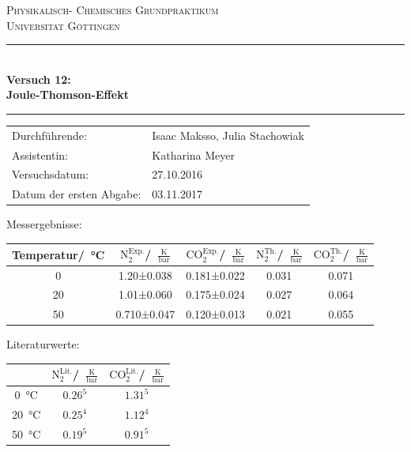 \documentclass[a4paper,12pt,oneside,onecolum,final,openany]{report}
\begin{document}
\begin{titlepage}
\centering
\textsc{\Large Physikalisch- Chemisches Grundpraktikum\\[1.5ex] Universität Göttingen}

\vspace*{0.5cm}

\rule{\textwidth}{1pt}\\[0.5cm]
{\huge \bfseries
  Versuch 12: \\[1.5ex]
  Joule-Thomson-Effekt}\\[0.5cm]
\rule{\textwidth}{1pt}

\vspace*{0.5cm}


\begin{Large}
\begin{tabular}{ll}
Durchführende: &  Isaac Maksso, Julia Stachowiak\\
Assistentin: & Katharina Meyer \\
 Versuchsdatum: & 27.10.2016\\
 Datum der ersten Abgabe: & 03.11.2017\\
\end{tabular}
\end{Large}

\vspace*{0.5cm}

 Messergebnisse:\\
\begin{table}[h]
\centering 
 \begin{tabular}{c|c|c|c|c}
 Temperatur/~°C&$\text{N}_2^{\text{Exp.}}$/~$\frac{\text{K}}{\text{bar}}$&$\text{CO}_2^{\text{Exp.}}$/~$\frac{\text{K}}{\text{bar}}$&$\text{N}_2^{\text{Th.}}$/~$\frac{\text{K}}{\text{bar}}$&$\text{CO}_2^{\text{Th.}}$/~$\frac{\text{K}}{\text{bar}}$\\
 \hline
 0 &1.20±0.038&0.181±0.022&0.031&0.071\\
 \hline
 20 &1.01±0.060&0.175±0.024&0.027&0.064\\
\hline 
50 &0.710±0.047&0.120±0.013&0.021&0.055\\
 \end{tabular}
\end{table}
 Literaturwerte:\\
\begin{table}[h]
\centering
\begin{tabular}{c|c|c}
  &$\text{N}_2^{\text{Lit.}}$/~$\frac{\text{K}}{\text{bar}}$&$\text{CO}_2^{\text{Lit.}}$/~$\frac{\text{K}}{\text{bar}}$\\
\hline
 0~°C &$0.26^{5}$ & $1.31^{5}$\\
\hline
20~°C&$0.25^{4}$& $1.12^{4}$\\
\hline
50~°C&$0.19^{5}$ &$0.91^{5}$\\
\end{tabular}
\end{table} 
\end{titlepage}
\tableofcontents
\end{document}
